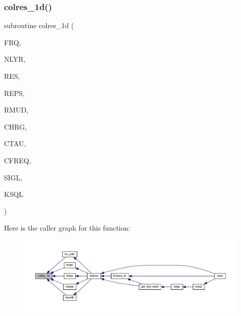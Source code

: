 \subsubsection{\texorpdfstring{colres\+\_\+1d()}{colres\_1d()}}
{\footnotesize\ttfamily subroutine colres\+\_\+1d (\begin{DoxyParamCaption}\item[{real}]{F\+RQ,  }\item[{integer}]{N\+L\+YR,  }\item[{real, dimension(nlyr)}]{R\+ES,  }\item[{real, dimension(nlyr)}]{R\+E\+PS,  }\item[{real(kind=ql), dimension(0\+:nlyr)}]{R\+M\+UD,  }\item[{real, dimension(nlyr)}]{C\+H\+RG,  }\item[{real, dimension(nlyr)}]{C\+T\+AU,  }\item[{real, dimension(nlyr)}]{C\+F\+R\+EQ,  }\item[{complex(kind=ql), dimension (nlyr)}]{S\+I\+GL,  }\item[{complex(kind=ql), dimension (nlyr)}]{K\+S\+QL }\end{DoxyParamCaption})}

Here is the caller graph for this function\+:\nopagebreak
\begin{figure}[H]
\begin{center}
\leavevmode
\includegraphics[width=350pt]{Leroi_8f90_a36d9dbba0b5eada45705f561c0035c54_icgraph}
\end{center}
\end{figure}
\mbox{\label{Leroi_8f90_a61eed94d3789d0474014a2cd34a792c6}} 

